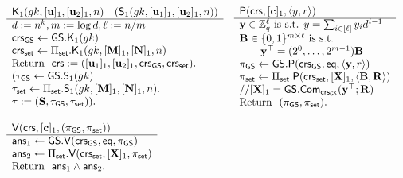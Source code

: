 \begin{figure} 
$$
\begin{array}{ll}
\begin{array}{l}
\algK_1(\gk,[\vecb{u}]_1,[\vecb{u}_2]_1,n)\quad (\mathsf{S}_1(\gk,[\vecb{u}_1]_1,[\vecb{u}_2]_1,n))\\
\hline
d:=n^k, m:=\log d, \ell := n/m\\
\crs_\GS\gets\GS.\algK_1(\gk)\\
{\crs_\sfset\gets\Pi_\sfset.\algK_1(\gk,[\matr{M}]_1,[\matr{N}]_1,n)}\\
\text{Return } \ \crs:=([\vecb{u}_1]_1,[\vecb{u}_2]_1,\crs_\GS,\crs_\sfset).\\
(\tau_\GS\gets\GS.\algS_1(\gk)\\
\tau_\sfset\gets\Pi_\sfset.\algS_1(\gk,[\matr{M}]_1,[\matr{N}]_1,n).\\
\tau := (\matr{S},\tau_\GS,\tau_\sfset)).\\
\\
\end{array}
&
\begin{array}{l}
{\algP(\crs, [\matr{c}]_1, \langle y, r\rangle)}\\
\hline
\vecb{y}\in\Z_q^{\ell} \text{ is s.t. } y=\sum_{i\in[\ell]}{y}_id^{i-1}\\
\matr{B}\in\bits^{m\times\ell} \text{ is s.t. }\\
\qquad \vecb{y}^\top = (2^0,\ldots,2^{m-1})\matr{B}\\
\pi_\GS\gets\GS.\algP(\crs_\GS,\eq,\langle \vecb{y},r\rangle)\\
\pi_\sfset \gets \Pi_\sfset.\algP(\crs_\sfset, [\matr{X}]_1,\langle\matr{B},\matr{R}\rangle)\\
//{[\matr{X}]_1} = \GS.\Com_{\crs_\GS}(\vecb{y}^\top;\matr{R})\\
\text{Return } \  (\pi_\GS,\pi_\sfset). \\
\\
\end{array}\\
\begin{array}{l}
{\algV(\crs,[\vecb{c}]_1,(\pi_\GS,\pi_\sfset))}\\
\hline
\mathsf{ans}_1 \gets \GS.\algV(\crs_\GS,\eq,\pi_\GS)\\
\mathsf{ans}_2 \gets \Pi_\sfset.\algV(\crs_\sfset,[\matr{X}]_1,\pi_\sfset)\\
\text{Return } \ \mathsf{ans}_1\wedge\mathsf{ans}_2.
\\
\\
\end{array}

\end{array}$$
\end{figure}
